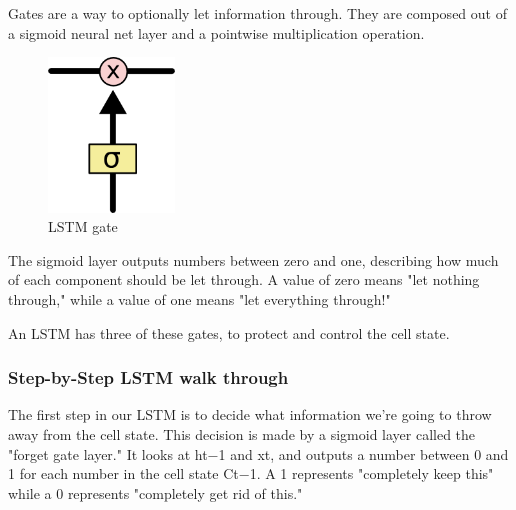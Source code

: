 {Gates are a way to optionally let information through. They are composed out of a sigmoid neural net layer and a pointwise multiplication operation.
\renewcommand{\figurename}{Abb.}
\begin{figure}[htp]
\centering
\includegraphics[width=0.30\textwidth]{pictures/LSTM3-gate.png}
\caption[LSTM gate]{LSTM gate\protect\footnotemark}
\end{figure}
The sigmoid layer outputs numbers between zero and one, describing how much of each component should be let through. A value of zero means "let nothing through," while a value of one means "let everything through!"

An LSTM has three of these gates, to protect and control the cell state.

\subsubsection{Step-by-Step LSTM walk through}
The first step in our LSTM is to decide what information we’re going to throw away from the cell state. This decision is made by a sigmoid layer called the "forget gate layer." It looks at ht−1 and xt, and outputs a number between 0 and 1 for each number in the cell state Ct−1. A 1 represents "completely keep this" while a 0 represents "completely get rid of this."

}
